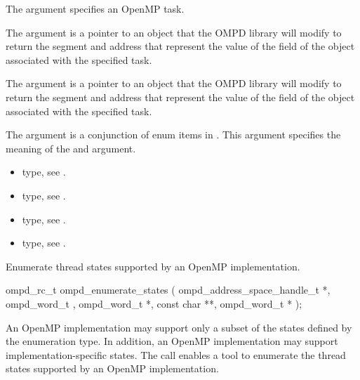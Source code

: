 \begin{itemize}
\argdesc

The argument  specifies an OpenMP task.

The argument  is a pointer to an  object that the OMPD library will
modify to return the segment and address that represent the value of the 
field of the  object associated with the specified task.

The argument  is a pointer to an  object that the OMPD library will
modify to return the segment and address that represent the value of the 
field of the  object associated with the specified task.

The  argument is a conjunction of enum items in
. This argument specifies the meaning of the 
 and  argument.

\crossreferences
\begin{itemize}
	\item {} type, see .
	\item {} type, see .
	\item {} type, see .
	\item {} type, see .
\end{itemize}


\label{subsubsubsec:ompd_enumerate_states}

\summary
Enumerate thread states supported by an OpenMP implementation.

\format
\begin{cspecific}
\begin{ompSyntax}
ompd_rc_t ompd_enumerate_states (
  ompd_address_space_handle_t *,
  ompd_word_t ,
  ompd_word_t *,
  const char **,
  ompd_word_t *
);
\end{ompSyntax}
\end{cspecific}

\descr
An OpenMP implementation may support only a subset of the states defined by
the  enumeration type. In addition, an
OpenMP implementation may support implementation-specific states.
The  call enables a tool to
enumerate the thread states supported by an OpenMP implementation.


\end{itemize}

